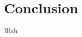\documentclass{article}
\begin{document}
\section{Conclusion}
Blah














\pagebreak


\end{document}
